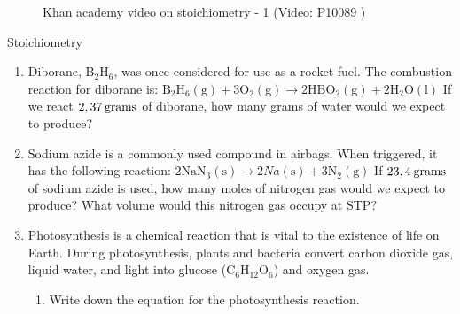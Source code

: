 \label{m38712*eip-546}
    \setcounter{subfigure}{0}
	\begin{figure}[H] %
    \textnormal{Khan academy video on stoichiometry - 1} \nopagebreak
  \label{m38712*yt-media4}\label{m38712*yt-video4}
             { (Video:  P10089 )}
 \end{figure}       \par \label{m38712*secfhsst!!!underscore!!!id2276}
    \noindent
            \begin{exercises}{  Stoichiometry
      }
            \nopagebreak \noindent
      \label{m38712*id285393}\begin{enumerate}[noitemsep, label=\textbf{\arabic*}. ] 
            \label{m38712*uid101}\item Diborane, $\text{B}{}_{2}\text{H}{}_{6}$, was once considered for use as a rocket fuel. The combustion reaction for diborane is:
${\text{B}}_{2}{\text{H}}_{6}\left(\text{g}\right)+3{\text{O}}_{2}\left(\text{g}\right)\to 2\text{H}\text{B}{\text{O}}_{2}\left(\text{g}\right)+2{\text{H}}_{2}\text{O}\left(\text{l}\right)$
If we react $2,37\phantom{\rule{2pt}{0ex}}\text{grams}$ of diborane, how many grams of water would we expect to produce?\newline
\label{m38712*uid102}\item Sodium azide is a commonly used compound in airbags. When triggered, it has the following reaction:
$2{\text{NaN}}_{3}\left(\text{s}\right)\to 2Na\left(\text{s}\right)+3{\text{N}}_{2}\left(\text{g}\right)$
If $23,4\phantom{\rule{2pt}{0ex}}\text{grams}$ of sodium azide is used, how many moles of nitrogen gas would we expect to produce? What volume would this nitrogen gas occupy at STP?\newline
\label{m38712*uid103}\item Photosynthesis is a chemical reaction that is vital to the existence of life on Earth. During photosynthesis, plants and bacteria convert carbon dioxide gas, liquid water, and light into glucose ($\text{C}{}_{6}\text{H}{}_{12}\text{O}{}_{6}$) and oxygen gas.
\label{m38712*id285674}\begin{enumerate}[noitemsep, label=\textbf{\alph*}. ] 
            \label{m38712*uid104}\item Write down the equation for the photosynthesis reaction.

\end{enumerate}
\end{enumerate}
\end{exercises}
